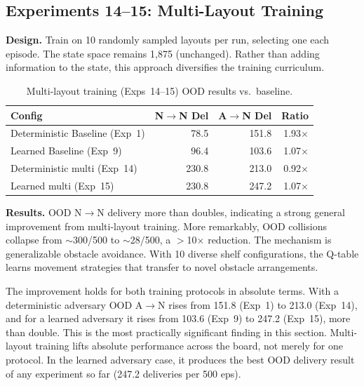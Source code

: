 \documentclass[sigconf]{aamas}
\begin{document}
\subsection{Experiments 14--15: Multi-Layout Training}
\textbf{Design.} Train on 10 randomly sampled layouts per run, selecting one each
episode. The state space remains 1,875 (unchanged). Rather than adding information
to the state, this approach diversifies the training curriculum.

\begin{table}[H]
\caption{Multi-layout training (Exps~14--15) OOD results vs.\ baseline.}
\label{tab:optionD}
\centering
\footnotesize
\begin{tabular}{lrrr}
\toprule
\textbf{Config} & \textbf{N$\to$N Del} & \textbf{A$\to$N Del} & \textbf{Ratio} \\
\midrule
Deterministic Baseline (Exp~1)   & 78.5  & 151.8  & 1.93$\times$ \\
Learned Baseline (Exp~9)   & 96.4  & 103.6  & 1.07$\times$ \\
Deterministic multi (Exp~14)          & 230.8 & 213.0 & 0.92$\times$ \\
Learned multi (Exp~15)           & 230.8 & 247.2 & 1.07$\times$ \\
\bottomrule
\end{tabular}
\end{table}

\textbf{Results.}
OOD N$\to$N delivery more than doubles, indicating a strong general improvement from multi-layout training. More remarkably,
OOD collisions collapse from $\sim$300/500 to $\sim$28/500, a $>$10$\times$
reduction. The mechanism is generalizable obstacle avoidance. With 10 diverse shelf
configurations, the Q-table learns movement strategies that transfer to novel
obstacle arrangements.

The improvement holds for both training protocols in absolute terms. With a deterministic adversary OOD A$\to$N rises
from 151.8 (Exp~1) to 213.0 (Exp~14), and for a learned adversary it rises from 103.6 (Exp~9) to 247.2 (Exp~15), more than double.
This is the most practically significant finding in this section. Multi-layout training lifts absolute performance across the board, not merely for one protocol. In the learned adversary case, 
it produces the best OOD delivery result of any experiment so far (247.2 deliveries per 500 eps).
\end{document}
